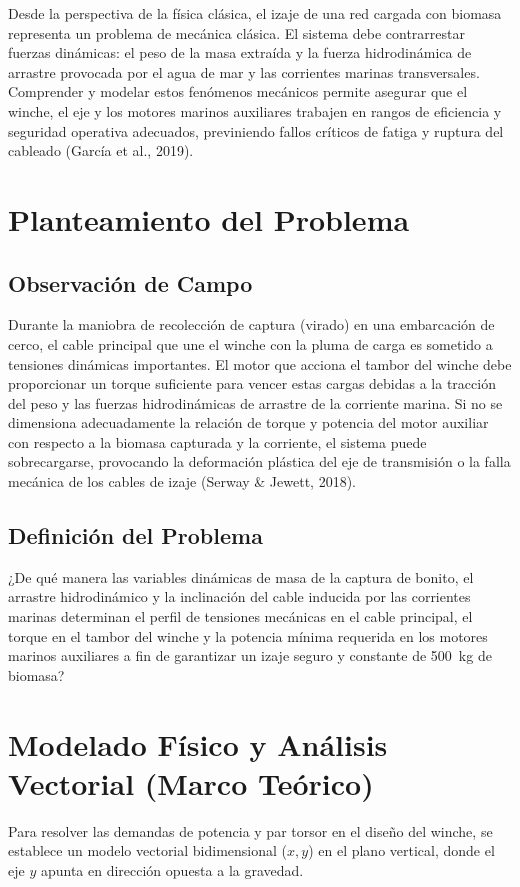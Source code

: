 \documentclass[11pt,a4paper]{article}
\begin{document}
Desde la perspectiva de la física clásica, el izaje de una red cargada con biomasa representa un problema de mecánica clásica. El sistema debe contrarrestar fuerzas dinámicas: el peso de la masa extraída y la fuerza hidrodinámica de arrastre provocada por el agua de mar y las corrientes marinas transversales. Comprender y modelar estos fenómenos mecánicos permite asegurar que el winche, el eje y los motores marinos auxiliares trabajen en rangos de eficiencia y seguridad operativa adecuados, previniendo fallos críticos de fatiga y ruptura del cableado (García et al., 2019).


\section{Planteamiento del Problema}

\subsection{Observación de Campo}
Durante la maniobra de recolección de captura (virado) en una embarcación de cerco, el cable principal que une el winche con la pluma de carga es sometido a tensiones dinámicas importantes. El motor que acciona el tambor del winche debe proporcionar un torque suficiente para vencer estas cargas debidas a la tracción del peso y las fuerzas hidrodinámicas de arrastre de la corriente marina. Si no se dimensiona adecuadamente la relación de torque y potencia del motor auxiliar con respecto a la biomasa capturada y la corriente, el sistema puede sobrecargarse, provocando la deformación plástica del eje de transmisión o la falla mecánica de los cables de izaje (Serway \& Jewett, 2018).

\subsection{Definición del Problema}
¿De qué manera las variables dinámicas de masa de la captura de bonito, el arrastre hidrodinámico y la inclinación del cable inducida por las corrientes marinas determinan el perfil de tensiones mecánicas en el cable principal, el torque en el tambor del winche y la potencia mínima requerida en los motores marinos auxiliares a fin de garantizar un izaje seguro y constante de \SI{500}{kg} de biomasa?

\section{Modelado Físico y Análisis Vectorial (Marco Teórico)}
Para resolver las demandas de potencia y par torsor en el diseño del winche, se establece un modelo vectorial bidimensional ($x, y$) en el plano vertical, donde el eje $y$ apunta en dirección opuesta a la gravedad.
\end{document}
